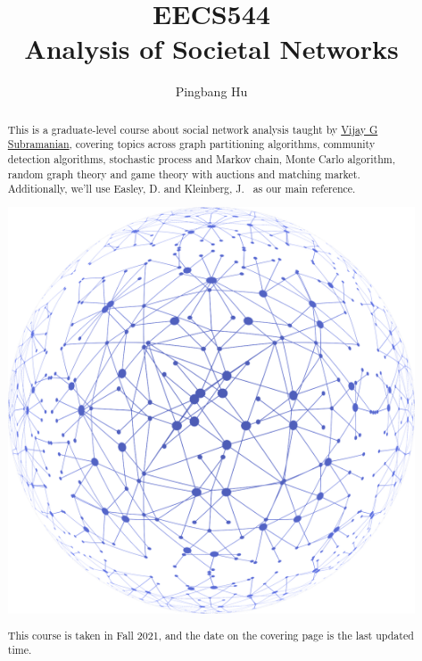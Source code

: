 \documentclass[a4paper]{report}
\author{Pingbang Hu}
\title{EECS544\\Analysis of Societal Networks}
\begin{document}
\maketitle

\begin{abstract}
	This is a graduate-level course about social network analysis taught by \href{https://subramanian.engin.umich.edu/}{Vijay G Subramanian}, covering topics across graph partitioning algorithms, community detection algorithms, stochastic process and Markov chain, Monte Carlo algorithm, random graph theory and game theory with auctions and matching market. Additionally, we'll use Easley, D. and Kleinberg, J.~\cite{easley2010networks} as our main reference.

	\vfill
	\begin{center}
		\includegraphics[width=\linewidth]{Figures/cover.png}
	\end{center}
	\vfill
	This course is taken in Fall 2021, and the date on the covering page is the last updated time.
\end{abstract}

\tableofcontents

\newpage


\newpage
\appendix
\appendixpage



\newpage
\printbibliography
\end{document}
